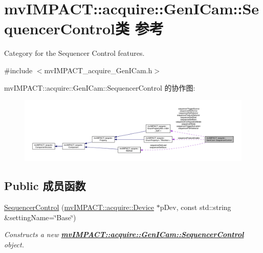 \hypertarget{classmv_i_m_p_a_c_t_1_1acquire_1_1_gen_i_cam_1_1_sequencer_control}{\section{mv\+I\+M\+P\+A\+C\+T\+:\+:acquire\+:\+:Gen\+I\+Cam\+:\+:Sequencer\+Control类 参考}
\label{classmv_i_m_p_a_c_t_1_1acquire_1_1_gen_i_cam_1_1_sequencer_control}
}


Category for the Sequencer Control features.  




{\ttfamily \#include $<$mv\+I\+M\+P\+A\+C\+T\+\_\+acquire\+\_\+\+Gen\+I\+Cam.\+h$>$}



mv\+I\+M\+P\+A\+C\+T\+:\+:acquire\+:\+:Gen\+I\+Cam\+:\+:Sequencer\+Control 的协作图\+:
\nopagebreak
\begin{figure}[H]
\begin{center}
\leavevmode
\includegraphics[width=350pt]{classmv_i_m_p_a_c_t_1_1acquire_1_1_gen_i_cam_1_1_sequencer_control__coll__graph}
\end{center}
\end{figure}
\subsection*{Public 成员函数}
\begin{DoxyCompactItemize}
\item 
\hyperlink{classmv_i_m_p_a_c_t_1_1acquire_1_1_gen_i_cam_1_1_sequencer_control_adc43769f66b198dfba7c456dd3cbbaa3}{Sequencer\+Control} (\hyperlink{classmv_i_m_p_a_c_t_1_1acquire_1_1_device}{mv\+I\+M\+P\+A\+C\+T\+::acquire\+::\+Device} $\ast$p\+Dev, const std\+::string \&setting\+Name=\char`\"{}Base\char`\"{})
\begin{DoxyCompactList}\small\item\em Constructs a new {\bfseries \hyperlink{classmv_i_m_p_a_c_t_1_1acquire_1_1_gen_i_cam_1_1_sequencer_control}{mv\+I\+M\+P\+A\+C\+T\+::acquire\+::\+Gen\+I\+Cam\+::\+Sequencer\+Control}} object. \end{DoxyCompactList}\end{DoxyCompactItemize}
